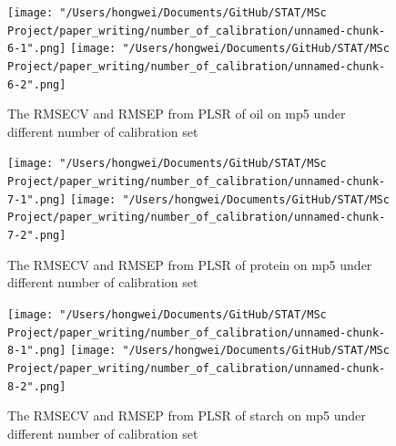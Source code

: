 \documentclass[a4paper,12pt,titlepage]{article} %
\numberwithin{equation}{section}  %
\begin{document}
\begin{appendices}
			\begin{figure}[h]    %
	\centering           %
	\texttt{[image: "/Users/hongwei/Documents/GitHub/STAT/MSc Project/paper\_writing/number\_of\_calibration/unnamed-chunk-6-1".png]}  %
	\texttt{[image: "/Users/hongwei/Documents/GitHub/STAT/MSc Project/paper\_writing/number\_of\_calibration/unnamed-chunk-6-2".png]}  %
	\caption{The RMSECV and RMSEP from PLSR of oil on mp5 under different number of calibration set}          %
	\label{fig:calibration_6-1}               %
\end{figure}                        %



			\begin{figure}[h]    %
	\centering           %
	\texttt{[image: "/Users/hongwei/Documents/GitHub/STAT/MSc Project/paper\_writing/number\_of\_calibration/unnamed-chunk-7-1".png]}  %
	\texttt{[image: "/Users/hongwei/Documents/GitHub/STAT/MSc Project/paper\_writing/number\_of\_calibration/unnamed-chunk-7-2".png]}  %
	\caption{The RMSECV and RMSEP from PLSR of protein on mp5 under different number of calibration set}          %
	\label{fig:calibration_6-1}               %
\end{figure}                        %



			\begin{figure}[h]    %
	\centering           %
	\texttt{[image: "/Users/hongwei/Documents/GitHub/STAT/MSc Project/paper\_writing/number\_of\_calibration/unnamed-chunk-8-1".png]}  %
	\texttt{[image: "/Users/hongwei/Documents/GitHub/STAT/MSc Project/paper\_writing/number\_of\_calibration/unnamed-chunk-8-2".png]}  %
	\caption{The RMSECV and RMSEP from PLSR of starch on mp5 under different number of calibration set}          %
	\label{fig:calibration_8-1}               %
\end{figure}                        %




\end{appendices}
\end{document}
